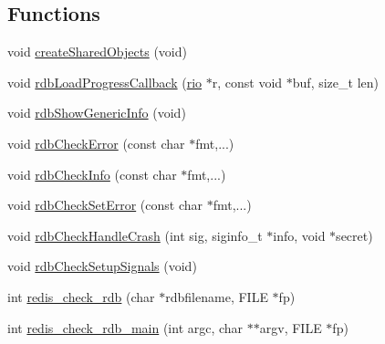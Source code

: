 \subsection*{Functions}
\begin{DoxyCompactItemize}
\item 
void \hyperlink{redis-check-rdb_8c_aacccd08c1c30ec2982422f0f349f96b3}{create\+Shared\+Objects} (void)
\item 
void \hyperlink{redis-check-rdb_8c_af6d87bf48e4005cb9147af693efba210}{rdb\+Load\+Progress\+Callback} (\hyperlink{rio_8h_a048ce06d2f559006ef67f885ceb2c1ca}{rio} $\ast$r, const void $\ast$buf, size\+\_\+t len)
\item 
void \hyperlink{redis-check-rdb_8c_a1f17cdac73dfda51e18f8722525e71ad}{rdb\+Show\+Generic\+Info} (void)
\item 
void \hyperlink{redis-check-rdb_8c_a5adb373ff5ec584f810c24e038ceed60}{rdb\+Check\+Error} (const char $\ast$fmt,...)
\item 
void \hyperlink{redis-check-rdb_8c_a6c0801e244c03a2379800bbd061e7287}{rdb\+Check\+Info} (const char $\ast$fmt,...)
\item 
void \hyperlink{redis-check-rdb_8c_aeaa1610f1c3775f7496cea0bad6161bc}{rdb\+Check\+Set\+Error} (const char $\ast$fmt,...)
\item 
void \hyperlink{redis-check-rdb_8c_a15854bd2367ac23a6497673292a2b8b5}{rdb\+Check\+Handle\+Crash} (int sig, siginfo\+\_\+t $\ast$info, void $\ast$secret)
\item 
void \hyperlink{redis-check-rdb_8c_abd77efc43c322dfa0c4963ca4b731828}{rdb\+Check\+Setup\+Signals} (void)
\item 
int \hyperlink{redis-check-rdb_8c_a155ad3442a606e949db548e697727447}{redis\+\_\+check\+\_\+rdb} (char $\ast$rdbfilename, F\+I\+LE $\ast$fp)
\item 
int \hyperlink{redis-check-rdb_8c_ac45f6a1c394687c26b8f0261661006e3}{redis\+\_\+check\+\_\+rdb\+\_\+main} (int argc, char $\ast$$\ast$argv, F\+I\+LE $\ast$fp)
\end{DoxyCompactItemize}
